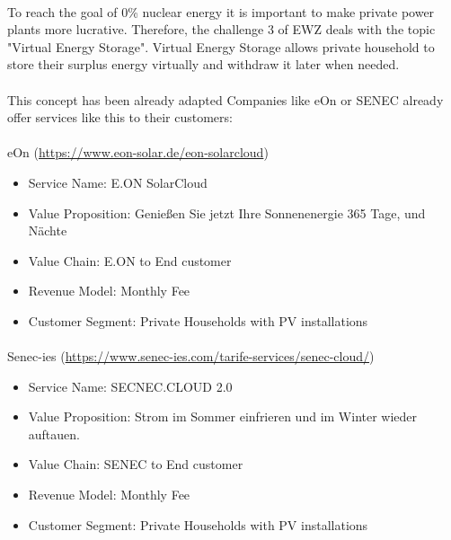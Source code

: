 \documentclass{scrartcl}
\begin{document}
	\paragraph{}
	To reach the goal of 0\% nuclear energy it is important to make private power plants more lucrative. Therefore, the challenge 3 of EWZ deals with the topic "Virtual Energy Storage". Virtual Energy Storage allows private household to store their surplus energy virtually and withdraw it later when needed.
	
	\paragraph{}
	This concept has been already adapted   Companies like eOn or SENEC already offer services like this to their customers:
	
	\paragraph{}
	eOn (\url{https://www.eon-solar.de/eon-solarcloud})
	
	\begin{itemize}
		\item Service Name:	E.ON SolarCloud
		\item Value Proposition: Genießen Sie jetzt Ihre Sonnenenergie 365 Tage, und Nächte
		\item Value Chain: E.ON to End customer
		\item Revenue Model: Monthly Fee
		\item Customer Segment: Private Households with PV installations
	\end{itemize}
	
	\paragraph{}
	Senec-ies (\url{https://www.senec-ies.com/tarife-services/senec-cloud/})
	
	\begin{itemize}
		\item Service Name: SECNEC.CLOUD 2.0
		\item Value Proposition: Strom im Sommer einfrieren und im Winter wieder auftauen.
		\item Value Chain: SENEC to End customer
		\item Revenue Model: Monthly Fee
		\item Customer Segment:	Private Households with PV installations
	\end{itemize}
\end{document}

